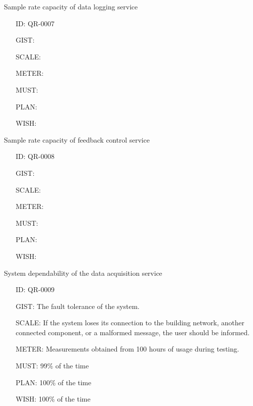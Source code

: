         Sample rate capacity of data logging service

        \begin{itemize}
          \setlength{\itemindent}{.5in}
          \itemsep .15em
          \item[ID:] QR-0007
          \item[GIST:]
          \item[SCALE:]
          \item[METER:]
          \item[MUST:]
          \item[PLAN:]
          \item[WISH:]
        \end{itemize}

        Sample rate capacity of feedback control service

        \begin{itemize}
          \setlength{\itemindent}{.5in}
          \itemsep .15em
          \item[ID:] QR-0008
          \item[GIST:]
          \item[SCALE:]
          \item[METER:]
          \item[MUST:]
          \item[PLAN:]
          \item[WISH:]
        \end{itemize}

        System dependability of the data acquisition service

        \begin{itemize}
          \setlength{\itemindent}{.5in}
          \itemsep .15em
          \item[ID:] QR-0009
          \item[GIST:] The fault tolerance of the system.
          \item[SCALE:] If the system loses its connection to the building
            network, another connected component, or a malformed message, the
            user should be informed.
          \item[METER:] Measurements obtained from 100 hours of usage during
            testing.
          \item[MUST:] 99\% of the time
          \item[PLAN:] 100\% of the time
          \item[WISH:] 100\% of the time
        \end{itemize}

